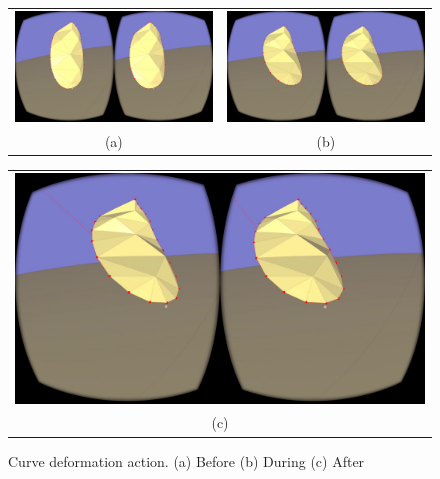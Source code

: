\begin{figure}[!h]
    \centering
    \setlength{\tabcolsep}{0.0130\linewidth}
    \begin{tabular}{@{}cc@{}}
    \includegraphics[width=0.45\linewidth]{figures/pre_pull} &
       	\includegraphics[width=0.45\linewidth]{figures/during_pull} \\
       	(a)&(b)\\
       	\end{tabular}
       	
       	  \centering
    \setlength{\tabcolsep}{0.0130\linewidth}
    \begin{tabular}{@{}c@{}}
    \includegraphics[width=0.926\linewidth]{figures/post_pull}\\
    (c)
    \end{tabular}
    \caption[Curve deformation action]{Curve deformation action.
    	  \textup{(a)} Before \textup{(b)} During \textup{(c)} After
      \label{fig:pull_example}}
\end{figure}

